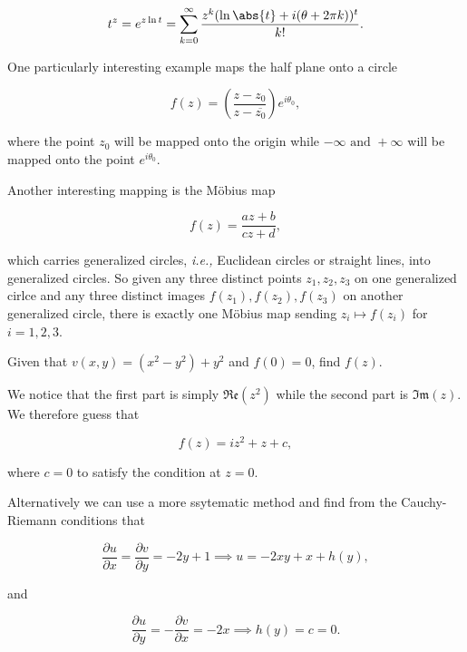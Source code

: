 \documentclass[english,a4paper,12pt]{report}
\begin{document}
\begin{equation}
    t^{z} = e^{z \ln t} = \sum_{k=0}^{\infty} \frac{z^{k} (\ln \abs{t} + i(\theta +2\pi k) )^{t} }{k!}.  
\end{equation}

One particularly interesting example maps the half plane onto a circle

\begin{equation}
    f(z) = \left( \frac{z-z_0 }{z-\overline{z_0} }  \right) e^{i \theta _{0} },
\end{equation}

where the point \(z_0 \) will be mapped onto the origin while \(-\infty \text { and } + \infty\) will be mapped onto the point \(e^{i \theta _{0} } \).  

Another interesting mapping is the Möbius map

\begin{equation}
    f(z) = \frac{az+b}{cz+d}, 
\end{equation}

which carries generalized circles, \textit{i.e.,} Euclidean circles or straight lines, into generalized circles. So given any three distinct points \(z_1 ,z_2, z_3 \) on one generalized cirlce and any three distinct images \(f(z_1 ), f(z_2 ), f(z_3 )\) on another generalized circle, there is exactly one Möbius map sending \(z_{i} \mapsto f(z_{i} ) \) for \(i = 1,2,3\).    

{Given that \(v(x,y)  = (x^2-y^2) + y^2\) and \(f(0)=0\), find \(f(z)\).  }
{We notice that the first part is simply \(\mathfrak{Re} (z^2) \) while the second part is \(\mathfrak{Im} (z) \). We therefore guess that 

\begin{equation}
    f(z) = iz^2+z+c, 
\end{equation}

where \(c = 0\) to satisfy the condition at \(z = 0\).

Alternatively we can use a more ssytematic method and find from the Cauchy-Riemann conditions that 

\begin{equation}
    \frac{\partial u}{\partial x} = \frac{\partial v}{\partial y} = -2y+1 \implies u = -2xy+x+h(y),
\end{equation}

and 

\begin{equation}
    \frac{\partial u}{\partial y} = -\frac{\partial v}{\partial x} = -2x \implies h(y) = c = 0.
\end{equation}
~
} 
\end{document}
